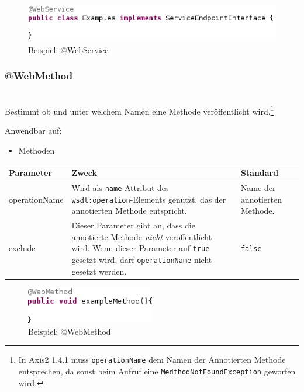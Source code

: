 \documentclass[runningheads]{llncs}
\newcommand{\anntabwidth}{\textwidth}
\begin{document}
    \begin{figure}[ht!]
      \centering
      \includegraphics[width=\textwidth]{../images/AtWebService.png}
      \caption{Beispiel: @WebService}
      \label{fig:ws}
    \end{figure} \vfill

    \subsubsection{@WebMethod}\ \\
      Bestimmt ob und unter welchem Namen eine Methode veröffentlicht wird.\footnote{In Axis2 1.4.1
      muss \texttt{operationName} dem Namen der Annotierten Methode entsprechen, da sonst beim
      Aufruf eine \texttt{MedthodNotFoundException} geworfen wird.}

      \noindent{}Anwendbar auf:
      \begin{itemize}
       \item Methoden\vfill
      \end{itemize}
    \tymin=75pt
    \begin{tabulary}{\anntabwidth}{|l|L|L|}
    \hline
    \textbf{Parameter} & \textbf{Zweck} & \textbf{Standard} \\
    \hline
      operationName &
      Wird als \texttt{name}-Attribut des \texttt{wsdl:operation}-Elements genutzt, das der
      annotierten Methode entspricht. &
      Name der annotierten Methode. \\
    \hline
      exclude &
      Dieser Parameter gibt an, dass die annotierte Methode \emph{nicht} veröffentlicht wird.
      \newline Wenn dieser Parameter auf \texttt{true} gesetzt wird, darf \texttt{operationName}
      nicht gesetzt werden. &
      \texttt{false} \\
    \hline
    \end{tabulary} \vfill
    \tymin=10pt
    \begin{figure}[ht!]
      \centering
      \includegraphics[width=0.5\textwidth]{../images/AtWebMethod.png}
      \caption{Beispiel: @WebMethod}
      \label{fig:wm}
    \end{figure}
\end{document}

